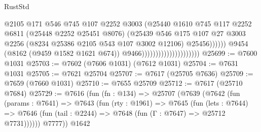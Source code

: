 \begin{lexlean}{RustStd}
\begin{coremodule}
                                                      @2105
                                                      @171
                                                      @546
                                                      @745
                                                      @107
                                                      @2252
                                                      @3003
                                                      (@25440
                                                        @1610
                                                        @745
                                                        @117
                                                        @2252
                                                        @6811
                                                        (@25448 @2252 @25451 @8076)
                                                        (@25439
                                                          @546
                                                          @175
                                                          @107
                                                          @27
                                                          @3003
                                                          @2256
                                                          (@8234
                                                            @25386
                                                            @2105
                                                            @543
                                                            @107
                                                            @3002
                                                            @12106)
                                                          @25456))))))
                                              @9454
                                              (@8162 (@9459 @1582 @1621 @674))
                                              @9466)))))))))))))))))))))
@25699 := @7600 @1031
@25703 := @7602 (@7606 @1031) (@7612 @1031)
@25704 := @7631 @1031
@25705 := @7621 @25704
@25707 := @7617 (@25705 @7636)
@25709 := @7659 (@7660 @1031)
@25710 := @7655 @25709
@25712 := @7617 (@25710 @7684)
@25729 := @7616
    (fun (fn : @134) =>
    @25707
      (@7639
        (@7642
          (fun (params : @7641) =>
          @7643
            (fun (rty : @1961) =>
            @7645
              (fun (lets : @7644) =>
              @7646 (fun (tail : @2244) => @7648 (fun (Γ : @7647) => @25712 @7731))))))
        @7777))
    @1642

\end{coremodule}
\end{lexlean}
